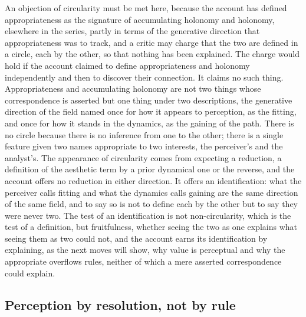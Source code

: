 An objection of circularity must be met here, because the account has defined appropriateness as the signature of accumulating holonomy and holonomy, elsewhere in the series, partly in terms of the generative direction that appropriateness was to track, and a critic may charge that the two are defined in a circle, each by the other, so that nothing has been explained. The charge would hold if the account claimed to define appropriateness and holonomy independently and then to discover their connection. It claims no such thing. Appropriateness and accumulating holonomy are not two things whose correspondence is asserted but one thing under two descriptions, the generative direction of the field named once for how it appears to perception, as the fitting, and once for how it stands in the dynamics, as the gaining of the path. There is no circle because there is no inference from one to the other; there is a single feature given two names appropriate to two interests, the perceiver's and the analyst's. The appearance of circularity comes from expecting a reduction, a definition of the aesthetic term by a prior dynamical one or the reverse, and the account offers no reduction in either direction. It offers an identification: what the perceiver calls fitting and what the dynamics calls gaining are the same direction of the same field, and to say so is not to define each by the other but to say they were never two. The test of an identification is not non-circularity, which is the test of a definition, but fruitfulness, whether seeing the two as one explains what seeing them as two could not, and the account earns its identification by explaining, as the next moves will show, why value is perceptual and why the appropriate overflows rules, neither of which a mere asserted correspondence could explain.

\subsection{Perception by resolution, not by rule}
\label{p22:sub:coupling-resolution}

